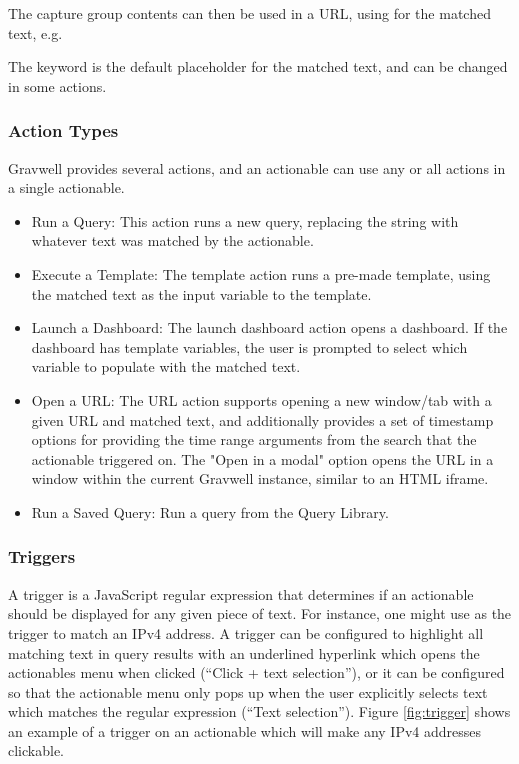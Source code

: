 The capture group contents can then be used in a URL, using  for the matched text, e.g. 

The keyword  is the default placeholder for the matched text, and can be changed in some actions.

\subsubsection{Action Types}

Gravwell provides several actions, and an actionable can use any or all actions in a single actionable. 

\begin{itemize}
\item Run a Query: This action runs a new query, replacing the string  with whatever text was matched by the actionable.
\item Execute a Template: The template action runs a pre-made template, using the matched text as the input variable to the template. 
\item Launch a Dashboard: The launch dashboard action opens a dashboard. If the dashboard has template variables, the user is prompted to select which variable to populate with the matched text.
\item Open a URL: The URL action supports opening a new window/tab with a given URL and matched text, and additionally provides a set of timestamp options for providing the time range arguments from the search that the actionable triggered on.  The "Open in a modal" option opens the URL in a window within the current Gravwell instance, similar to an HTML iframe.
\item Run a Saved Query: Run a query from the Query Library. 
\end{itemize}


\subsubsection{Triggers}

A trigger is a JavaScript regular expression that determines if an actionable should be displayed for any given piece of text. For instance, one might use  as the trigger to match an IPv4 address. A trigger can be configured to highlight all matching text in query results with an underlined hyperlink which opens the actionables menu when clicked (``Click + text selection''), or it can be configured so that the actionable menu only pops up when the user explicitly selects text which matches the regular expression (``Text selection''). Figure \ref{fig:trigger} shows an example of a trigger on an actionable which will make any IPv4 addresses clickable.

